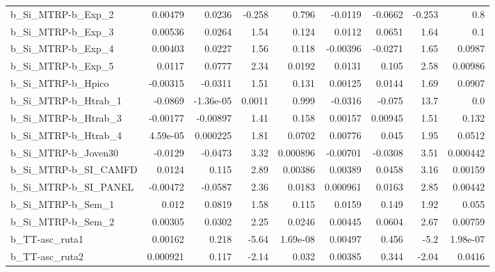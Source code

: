 \begin{tabular}{lrrrrrrrr}
b\_Si\_MTRP-b\_Exp\_2          &     0.00479 &       0.0236 &   -0.258 &    0.796 &    -0.0119 &     -0.0662 &       -0.253 &           0.8 \\
b\_Si\_MTRP-b\_Exp\_3          &     0.00536 &       0.0264 &     1.54 &    0.124 &     0.0112 &      0.0651 &         1.64 &           0.1 \\
b\_Si\_MTRP-b\_Exp\_4          &     0.00403 &       0.0227 &     1.56 &    0.118 &   -0.00396 &     -0.0271 &         1.65 &        0.0987 \\
b\_Si\_MTRP-b\_Exp\_5          &      0.0117 &       0.0777 &     2.34 &   0.0192 &     0.0131 &       0.105 &         2.58 &       0.00986 \\
b\_Si\_MTRP-b\_Hpico          &    -0.00315 &      -0.0311 &     1.51 &    0.131 &    0.00125 &      0.0144 &         1.69 &        0.0907 \\
b\_Si\_MTRP-b\_Htrab\_1        &     -0.0869 &    -1.36e-05 &   0.0011 &    0.999 &    -0.0316 &      -0.075 &         13.7 &           0.0 \\
b\_Si\_MTRP-b\_Htrab\_3        &    -0.00177 &     -0.00897 &     1.41 &    0.158 &    0.00157 &     0.00945 &         1.51 &         0.132 \\
b\_Si\_MTRP-b\_Htrab\_4        &    4.59e-05 &     0.000225 &     1.81 &   0.0702 &    0.00776 &       0.045 &         1.95 &        0.0512 \\
b\_Si\_MTRP-b\_Joven30        &     -0.0129 &      -0.0473 &     3.32 & 0.000896 &   -0.00701 &     -0.0308 &         3.51 &      0.000442 \\
b\_Si\_MTRP-b\_SI\_CAMFD       &      0.0124 &        0.115 &     2.89 &  0.00386 &    0.00389 &      0.0458 &         3.16 &       0.00159 \\
b\_Si\_MTRP-b\_SI\_PANEL       &    -0.00472 &      -0.0587 &     2.36 &   0.0183 &   0.000961 &      0.0163 &         2.85 &       0.00442 \\
b\_Si\_MTRP-b\_Sem\_1          &       0.012 &       0.0819 &     1.58 &    0.115 &     0.0159 &       0.149 &         1.92 &         0.055 \\
b\_Si\_MTRP-b\_Sem\_2          &     0.00305 &       0.0302 &     2.25 &   0.0246 &    0.00445 &      0.0604 &         2.67 &       0.00759 \\
b\_TT-asc\_ruta1             &     0.00162 &        0.218 &    -5.64 & 1.69e-08 &    0.00497 &       0.456 &         -5.2 &      1.98e-07 \\
b\_TT-asc\_ruta2             &    0.000921 &        0.117 &    -2.14 &    0.032 &    0.00385 &       0.344 &        -2.04 &        0.0416 \\

\end{tabular}
